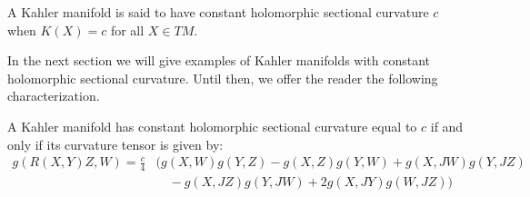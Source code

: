 \begin{definition} A Kahler manifold is said to have constant holomorphic sectional curvature $c$ when $K(X) = c$ for all $X \in TM$.
\end{definition}
%
In the next section we will give examples of Kahler manifolds with constant holomorphic sectional curvature.  Until then, we offer the reader the following characterization.
%
\begin{prop} A Kahler manifold has constant holomorphic sectional curvature equal to $c$ if and only if its curvature tensor is given by:
%
\begin{align*}
g( R(X,Y)Z, W ) = \frac{c}{4} & ( g(X,W)g(Y,Z) - g(X,Z)g(Y,W) + g(X,JW)g(Y,JZ) \\
& \quad - g(X,JZ)g(Y,JW) + 2g(X,JY)g(W,JZ) )
\end{align*}
%
\end{prop}
%
